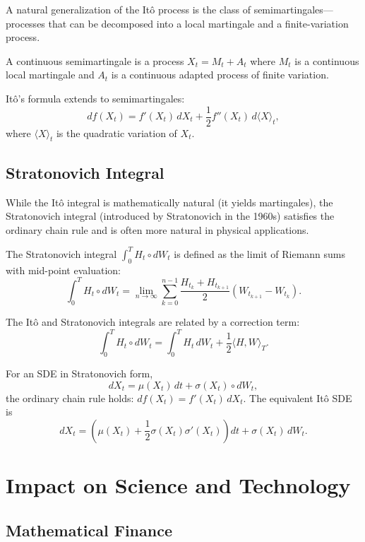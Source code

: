 A natural generalization of the It\^{o} process is the class of semimartingales---processes that can be decomposed into a local martingale and a finite-variation process.

\begin{definition}
A continuous semimartingale is a process \(X_t = M_t + A_t\) where \(M_t\) is a continuous local martingale and \(A_t\) is a continuous adapted process of finite variation.
\end{definition}

It\^{o}'s formula extends to semimartingales:
\[
df(X_t) = f'(X_t)\,dX_t + \frac12 f''(X_t)\,d\langle X\rangle_t,
\]
where \(\langle X\rangle_t\) is the quadratic variation of \(X_t\).

\subsection{Stratonovich Integral}

While the It\^{o} integral is mathematically natural (it yields martingales), the Stratonovich integral (introduced by Stratonovich in the 1960s) satisfies the ordinary chain rule and is often more natural in physical applications.

\begin{definition}
The Stratonovich integral \(\int_0^T H_t \circ dW_t\) is defined as the limit of Riemann sums with mid-point evaluation:
\[
\int_0^T H_t \circ dW_t = \lim_{n \to \infty} \sum_{k=0}^{n-1} \frac{H_{t_k} + H_{t_{k+1}}}{2} (W_{t_{k+1}} - W_{t_k}).
\]
\end{definition}

The It\^{o} and Stratonovich integrals are related by a correction term:
\[
\int_0^T H_t \circ dW_t = \int_0^T H_t \, dW_t + \frac12 \langle H, W\rangle_T.
\]

For an SDE in Stratonovich form,
\[
dX_t = \mu(X_t)\,dt + \sigma(X_t) \circ dW_t,
\]
the ordinary chain rule holds: \(df(X_t) = f'(X_t)\,dX_t\). The equivalent It\^{o} SDE is
\[
dX_t = \left(\mu(X_t) + \frac12 \sigma(X_t) \sigma'(X_t)\right) dt + \sigma(X_t)\,dW_t.
\]

\section{Impact on Science and Technology}

\subsection{Mathematical Finance}

